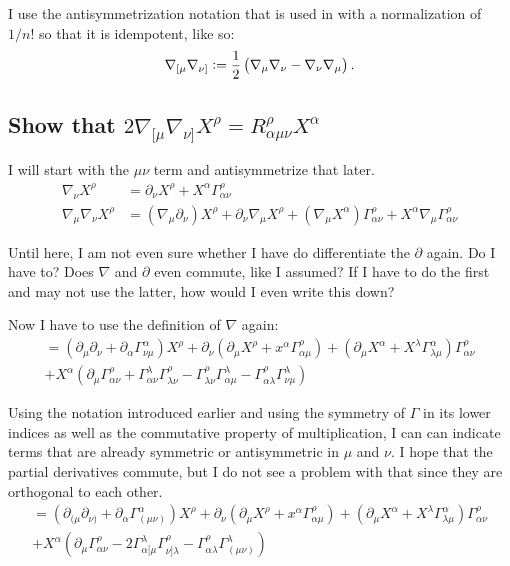 I use the antisymmetrization notation that is used in
\parencite{penrose-road_to_reality} with a normalization of $1/n!$ so that it
is idempotent, like so:
\[
    \nabla_{[\mu} \nabla_{\nu]} := \frac 12 \del{
        \nabla_{\mu} \nabla_{\nu} - \nabla_{\nu} \nabla_{\mu}
    }.
\]

\subsection{Show that $2 \nabla_{[\mu} \nabla_{\nu]} X^\rho =
R^\rho_{\alpha\mu\nu} X^\alpha$}

I will start with the $\mu\nu$ term and antisymmetrize that later.
\begin{align*}
    \nabla_\nu X^\rho
    &=
    \partial_\nu X^\rho + X^\alpha \Gamma^\rho_{\alpha\nu} \\
    \nabla_\mu \nabla_\nu X^\rho
    &=
    (\nabla_\mu \partial_\nu) X^\rho
    + \partial_\nu \nabla_\mu X^\rho
    + (\nabla_\mu X^\alpha) \Gamma^\rho_{\alpha\nu}
    + X^\alpha \nabla_\mu \Gamma^\rho_{\alpha\nu}
\end{align*}
%
\begin{aside}
    Until here, I am not even sure whether I have do differentiate the
    $\partial$ again. Do I have to? Does $\nabla$ and $\partial$ even commute,
    like I assumed? If I have to do the first and may not use the latter, how
    would I even write this down?
\end{aside}

Now I have to use the definition of $\nabla$ again:
\begin{multline*}
    = (\partial_\mu \partial_\nu + \partial_\alpha \Gamma^\alpha_{\nu\mu})
    X^\rho
    + \partial_\nu (\partial_\mu X^\rho + x^\alpha \Gamma^\rho_{\alpha\mu})
    + (\partial_\mu X^\alpha + X^\lambda \Gamma^\alpha_{\lambda\mu})
    \Gamma^\rho_{\alpha\nu} \\
    + X^\alpha (\partial_\mu \Gamma^\rho_{\alpha\nu} +
    \Gamma^\lambda_{\alpha\nu} \Gamma^\rho_{\lambda\nu} -
    \Gamma^\rho_{\lambda\nu} \Gamma^\lambda_{\alpha\mu} -
    \Gamma^\rho_{\alpha\lambda} \Gamma^\lambda_{\nu\mu})
\end{multline*}

Using the notation introduced earlier and using the symmetry of $\Gamma$ in its
lower indices as well as the commutative property of multiplication, I can
can indicate terms that are already symmetric or antisymmetric in $\mu$ and
$\nu$. I hope that the partial derivatives commute, but I do not see a problem
with that since they are orthogonal to each other.
\begin{multline*}
    = (\partial_{(\mu} \partial_{\nu)} + \partial_\alpha
    \Gamma^\alpha_{(\mu\nu)})
    X^\rho
    + \partial_\nu (\partial_\mu X^\rho + x^\alpha \Gamma^\rho_{\alpha\mu})
    + (\partial_\mu X^\alpha + X^\lambda \Gamma^\alpha_{\lambda\mu})
    \Gamma^\rho_{\alpha\nu} \\
    + X^\alpha (\partial_\mu \Gamma^\rho_{\alpha\nu}
    - 2 \Gamma^\lambda_{\alpha[\mu} \Gamma^\rho_{\nu]\lambda}
    - \Gamma^\rho_{\alpha\lambda} \Gamma^\lambda_{(\mu\nu)})
\end{multline*}

